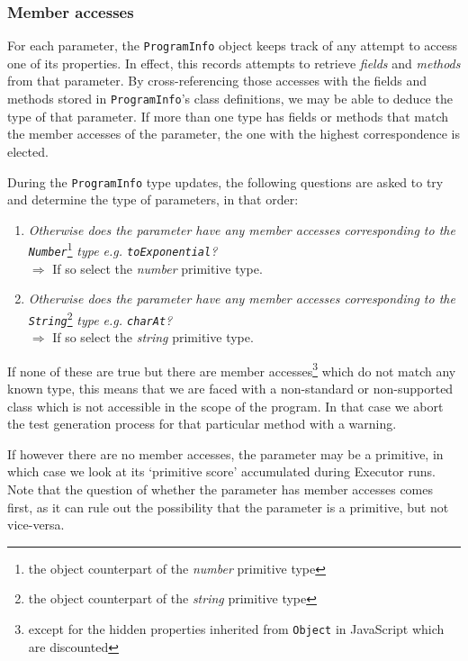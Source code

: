 \subsubsection{Member accesses}
For each parameter, the \texttt{ProgramInfo} object keeps track of any attempt to access one of its properties. In effect, this records attempts to retrieve \emph{fields} and \emph{methods} from that parameter. By cross-referencing those accesses with the fields and methods stored in \texttt{ProgramInfo}'s class definitions, we may be able to deduce the type of that parameter. If more than one type has fields or methods that match the member accesses of the parameter, the one with the highest correspondence is elected.

During the \texttt{ProgramInfo} type updates, the following questions are asked to try and determine the type of parameters, in that order:

\begin{enumerate}
   \begin{item}
      \emph{Does the parameter have any user-defined member accesses?}\\\(\Rightarrow\) If so select the highest match.
   \end{item}
   \item \emph{Otherwise does the parameter have any member accesses corresponding to the \texttt{\emph{Number}}}\footnote{the object counterpart of the \emph{number} primitive type} \emph{type e.g. \texttt{\emph{toExponential}}?}\\\(\Rightarrow\) If so select the \emph{number} primitive type.
   \item \emph{Otherwise does the parameter have any member accesses corresponding to the \texttt{\emph{String}}}\footnote{the object counterpart of the \emph{string} primitive type} \emph{type e.g. \texttt{\emph{charAt}}?}\\\(\Rightarrow\) If so select the \emph{string} primitive type.
\end{enumerate}

If none of these are true but there are member accesses\footnote{except for the hidden properties inherited from \texttt{Object} in JavaScript which are discounted} which do not match any known type, this means that we are faced with a non-standard or non-supported class which is not accessible in the scope of the program. In that case we abort the test generation process for that particular method with a warning.

If however there are no member accesses, the parameter may be a primitive, in which case we look at its `primitive score' accumulated during \textsf{Executor} runs. Note that the question of whether the parameter has member accesses comes first, as it can rule out the possibility that the parameter is a primitive, but not vice-versa.

